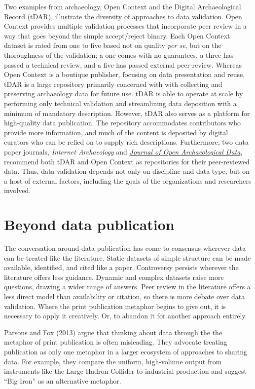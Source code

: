 \documentclass[10pt,a4paper,twocolumn]{article}
\begin{document}
{Two examples from archaeology, Open Context and the Digital Archaeological Record (tDAR), illustrate the diversity of approaches to data validation.
Open Context provides multiple validation processes that incorporate peer review in a way that goes beyond the simple accept/reject binary\cite{kansa_we_2013}.
Each Open Context dataset is rated from one to five based not on quality \emph{per se}, but on the thoroughness of the validation; a one comes with no guarantees, a three has passed a technical review, and a five has passed external peer-review.
Whereas Open Context is a boutique publisher, focusing on data presentation and reuse, tDAR is a large repository primarily concerned with with collecting and preserving archaeology data for future use.
tDAR is able to operate at scale by performing only technical validation and streamlining data deposition with a minimum of mandatory description.
However, tDAR also serves as a platform for high-quality data publication.
The repository accommodates contributors who provide more information, and much of the content is deposited by digital curators who can be relied on to supply rich descriptions.
Furthermore, two data paper journals, \emph{Internet Archaeology} and \href{http://openarchaeologydata.metajnl.com/}{\emph{Journal of Open Archaeological Data}}, recommend both tDAR and Open Context as repositories for their peer-reviewed data.
Thus, data validation depends not only on discipline and data type, but on a host of external factors, including the goals of the organizations and researchers involved.


\section*{Beyond data publication}\label{beyond-data-publication}

The conversation around data publication has come to consensus wherever data can be treated like the literature.
Static datasets of simple structure can be made available, identified, and cited like a paper.
Controversy persists wherever the literature offers less guidance.
Dynamic and complex datasets raise more questions, drawing a wider range of answers.
Peer review in the literature offers a less direct model than availability or citation, so there is more debate over data validation.
Where the print publication metaphor begins to give out, it is necessary to apply it creatively.
Or, to abandon it for another approach entirely.

Parsons and Fox (2013)\cite{parsons_is_2013} argue that thinking about data through the the metaphor of print publication is often misleading.
They advocate treating publication as only one metaphor in a larger ecosystem of approaches to sharing data.
For example, they compare the uniform, high-volume output from instruments like the Large Hadron Collider to industrial production and suggest ``Big Iron'' as an alternative metaphor.

}
\end{document}
